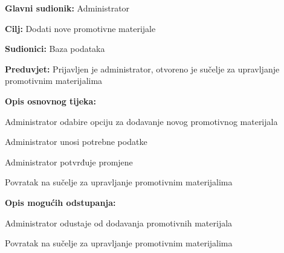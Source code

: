 					\noindent {}
					\begin{packed_item}
						
						\item \textbf{Glavni sudionik: }Administrator
						\item  \textbf{Cilj:} Dodati nove promotivne materijale
						\item  \textbf{Sudionici:} Baza podataka
						\item  \textbf{Preduvjet:} Prijavljen je administrator, otvoreno je sučelje za upravljanje promotivnim materijalima
						\item  \textbf{Opis osnovnog tijeka:}
						
						\item[] \begin{packed_enum}
							
							\item Administrator odabire opciju za dodavanje novog promotivnog materijala
							\item Administrator unosi potrebne podatke
							\item Administrator potvrđuje promjene
							\item Povratak na sučelje za upravljanje promotivnim materijalima
						\end{packed_enum}
						
						\item  \textbf{Opis mogućih odstupanja:}
						
						\item[] \begin{packed_item}
							
							\item[4.a] Administrator odustaje od dodavanja promotivnih materijala
							\item[] \begin{packed_enum}
								
								\item Povratak na sučelje za upravljanje promotivnim materijalima
								
							\end{packed_enum}
							
						\end{packed_item}
					\end{packed_item}
					
